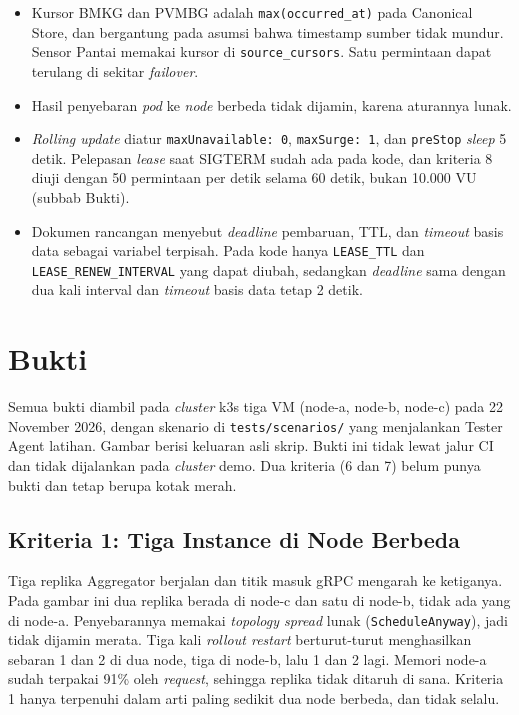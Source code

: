 \begin{itemize}
\item Kursor BMKG dan PVMBG adalah \texttt{max(occurred\_at)} pada Canonical Store, dan bergantung pada asumsi bahwa timestamp sumber tidak mundur. Sensor Pantai memakai kursor di \texttt{source\_cursors}. Satu permintaan dapat terulang di sekitar \textit{failover}.
\item Hasil penyebaran \textit{pod} ke \textit{node} berbeda tidak dijamin, karena aturannya lunak.
\item \textit{Rolling update} diatur \texttt{maxUnavailable: 0}, \texttt{maxSurge: 1}, dan \texttt{preStop} \textit{sleep} 5 detik. Pelepasan \textit{lease} saat SIGTERM sudah ada pada kode, dan kriteria 8 diuji dengan 50 permintaan per detik selama 60 detik, bukan 10.000 VU (subbab Bukti).
\item Dokumen rancangan menyebut \textit{deadline} pembaruan, TTL, dan \textit{timeout} basis data sebagai variabel terpisah. Pada kode hanya \texttt{LEASE\_TTL} dan \texttt{LEASE\_RENEW\_INTERVAL} yang dapat diubah, sedangkan \textit{deadline} sama dengan dua kali interval dan \textit{timeout} basis data tetap 2 detik.
\end{itemize}

\section{Bukti}

Semua bukti diambil pada \textit{cluster} k3s tiga VM (node-a, node-b, node-c) pada 22 November 2026, dengan skenario di \texttt{tests/scenarios/} yang menjalankan Tester Agent latihan. Gambar berisi keluaran asli skrip. Bukti ini tidak lewat jalur CI dan tidak dijalankan pada \textit{cluster} demo. Dua kriteria (6 dan 7) belum punya bukti dan tetap berupa kotak merah.

\subsection{Kriteria 1: Tiga Instance di Node Berbeda}

Tiga replika Aggregator berjalan dan titik masuk gRPC mengarah ke ketiganya. Pada gambar ini dua replika berada di node-c dan satu di node-b, tidak ada yang di node-a. Penyebarannya memakai \textit{topology spread} lunak (\texttt{ScheduleAnyway}), jadi tidak dijamin merata. Tiga kali \textit{rollout restart} berturut-turut menghasilkan sebaran 1 dan 2 di dua node, tiga di node-b, lalu 1 dan 2 lagi. Memori node-a sudah terpakai 91\% oleh \textit{request}, sehingga replika tidak ditaruh di sana. Kriteria 1 hanya terpenuhi dalam arti paling sedikit dua node berbeda, dan tidak selalu.

